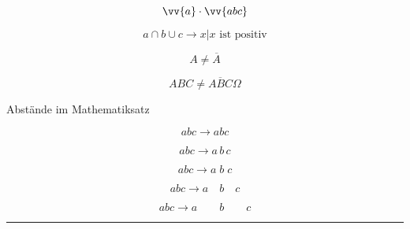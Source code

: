 \documentclass[12pt,ngerman,parskip=full]{scrreprt}
\begin{document}
\[ \vv{a}  \cdot \vv{abc} \]

\[  a \cap b  \cup c \rightarrow {x | x \text{ ist positiv}} \]

\[ A \not= \overline{A} \]

\[ ABC \not= \overline{ABC}  \Omega \]

\clearpage

Abstände im Mathematiksatz

\[ a b c \rightarrow abc \]

\[ a b c \rightarrow a\,b\,c \]

\[ a b c \rightarrow a\;b\;c \]


\[ a b c \rightarrow a\quad b\quad c \]

\[ a b c \rightarrow a\qquad b\qquad c \]

\hrule
\end{document}
